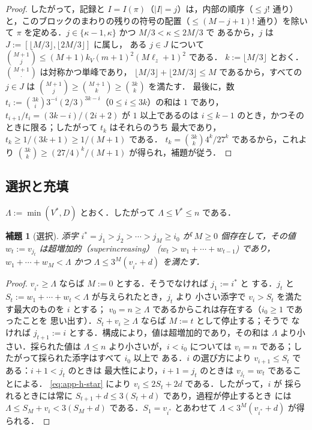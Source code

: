 \documentclass[11pt,a4paper]{ltjsarticle}
\numberwithin{equation}{section}
\theoremstyle{plain}
\newtheorem{lemma}[theorem]{補題}
\theoremstyle{definition}
\theoremstyle{remark}
\theoremstyle{plain}
\begin{document}
\begin{proof}
したがって，記録と $I=I(\pi)$（$|I|=j$）は，内部の順序（$\le j!$ 通り）
と，このブロックのまわりの残りの符号の配置（$\le(M-j+1)!$ 通り）を除いて
$\pi$ を定める．$j\in\{\kappa-1,\kappa\}$ かつ $M/3<\kappa\le2M/3$ で
あるから，$j$ は $J:=[\lfloor M/3\rfloor,\lfloor2M/3\rfloor]$ に属し，
ある $j\in J$ について
$\binom{M+1}{j}\le(M+1)k_V(m+1)^2(M\ell_z+1)^2$ である．
$k:=\lfloor M/3\rfloor$ とおく．$\binom{M+1}{\cdot}$ は対称かつ単峰であり，
$\lfloor M/3\rfloor+\lfloor2M/3\rfloor\le M$ であるから，すべての
$j\in J$ は $\binom{M+1}{j}\ge\binom{M+1}{k}\ge\binom{3k}{k}$ を満たす．
最後に，数 $t_i:=\binom{3k}{i}3^{-i}(2/3)^{3k-i}$（$0\le i\le3k$）の和は
$1$ であり，$t_{i+1}/t_i=(3k-i)/(2i+2)$ が $1$ 以上であるのは
$i\le k-1$ のとき，かつそのときに限る；したがって $t_k$ はそれらのうち
最大であり，$t_k\ge1/(3k+1)\ge1/(M+1)$ である．
$t_k=\binom{3k}{k}4^k/27^k$ であるから，これより
$\binom{3k}{k}\ge(27/4)^k/(M+1)$ が得られ，補題が従う．
\end{proof}

\subsection{選択と充填}

$\Lambda:=\min(V^*,D)$ とおく．したがって $\Lambda\le V^*\le n$ である．

\begin{lemma}[選択]
\label{lem:app-h-select}
添字 $i^*=j_1>j_2>\cdots>j_M\ge i_0$ が $M\ge0$ 個存在して，その値
$w_t:=v_{j_t}$ は超増加的（superincreasing）
\textup($w_t>w_1+\cdots+w_{t-1}$\textup) であり，
$w_1+\cdots+w_M<\Lambda$ かつ $\Lambda\le3^M(v_{i^*}+d)$ を満たす．
\end{lemma}

\begin{proof}
$v_{i^*}\ge\Lambda$ ならば $M:=0$ とする．そうでなければ $j_1:=i^*$ と
する．$j_t$ と $S_t:=w_1+\cdots+w_t<\Lambda$ が与えられたとき，$j_t$ より
小さい添字で $v_i>S_t$ を満たす最大のものを $i$ とする；
$v_0=n\ge\Lambda$ であるからこれは存在する（$i_0\ge1$ であったことを
思い出す）．$S_t+v_i\ge\Lambda$ ならば $M:=t$ として停止する；そうで
なければ $j_{t+1}:=i$ とする．構成により，値は超増加的であり，その和は
$\Lambda$ より小さい．採られた値は $\Lambda\le n$ より小さいが，$i<i_0$
については $v_i=n$ である；したがって採られた添字はすべて $i_0$ 以上で
ある．$i$ の選び方により $v_{i+1}\le S_t$ である：$i+1<j_t$ のときは
最大性により，$i+1=j_t$ のときは $v_{j_t}=w_t$ であることによる．
\eqref{eq:app-h-star} により $v_i\le2S_t+2d$ である．したがって，$i$ が
採られるときには常に $S_{t+1}+d\le3(S_t+d)$ であり，過程が停止するとき
には $\Lambda\le S_M+v_i<3(S_M+d)$ である．$S_1=v_{i^*}$ とあわせて
$\Lambda<3^M(v_{i^*}+d)$ が得られる．
\end{proof}
\end{document}
